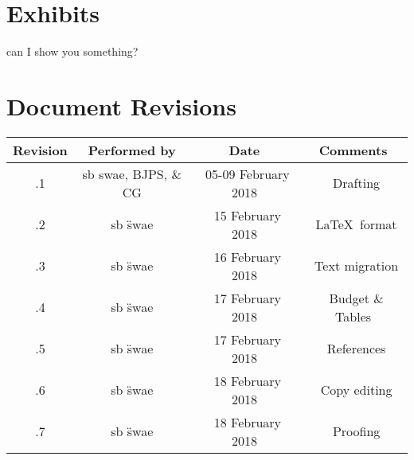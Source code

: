 \documentclass[11pt]{report}
\begin{document}
\chapter{Exhibits}
can I show you something?
\newpage


\chapter{Document Revisions}
\centering
\begin{tabular}{ || c | c | c | c ||}\hline \hline
  Revision & Performed by & Date & Comments \\ \hline\hline
 .1 & sb swae, BJPS, \& CG & \ 05-09 February 2018 & \ Drafting \\ \hline
 .2 & sb \"swae & \ 15 February 2018 & \ \LaTeX \  format \\ \hline 
.3 & sb \"swae & \ 16 February 2018 & \ Text migration \\ \hline 
.4 & sb \"swae & \ 17 February 2018 & \ Budget \& Tables \\ \hline 
.5 & sb \"swae & \ 17 February 2018 & \ References \\ \hline
.6 & sb \"swae & \ 18 February 2018 & \ Copy editing \\ \hline 
.7 & sb \"swae & \ 18 February 2018 & \ Proofing  \\ \hline 
\hline
\end{tabular}
\end{document}
